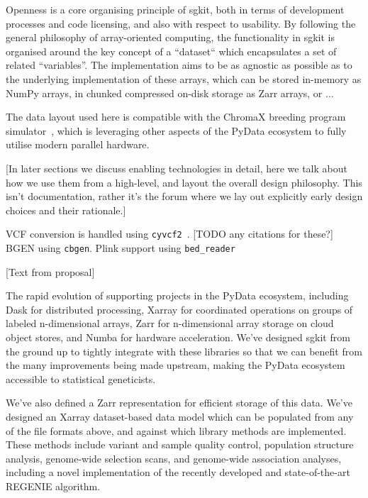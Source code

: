 \documentclass[a4paper,num-refs]{oup-contemporary}
\newcommand{\toolname}[1]{\texttt{#1}}
\begin{document}
Openness is a core organising principle of sgkit, both in terms of
development processes and code licensing, and also with respect
to usability. By following the general philosophy of array-oriented
computing, the functionality in sgkit is organised around the
key concept of a ``dataset`` which encapsulates a set of
related ``variables''. The implementation aims to be as agnostic
as possible as to the underlying implementation of these arrays,
which can be stored in-memory as NumPy arrays, in chunked
compressed on-disk storage as Zarr arrays, or ...

The data layout used here is compatible with the ChromaX
breeding program simulator~\citep{younis2023chromax}, which
is leveraging other aspects of the PyData ecosystem to
fully utilise modern parallel hardware.


[In later sections we discuss enabling technologies in detail,
here we talk about how we use them from a high-level, and layout
the overall design philosophy. This isn't documentation, rather
it's the forum where we lay out explicitly early design choices
and their rationale.]

VCF conversion is handled using
\toolname{cyvcf2}~\citep{pedersen2017cyvcf2}.
[TODO any citations for these?]
BGEN using \toolname{cbgen}.
Plink support using \toolname{bed\_reader}

[Text from proposal]

The rapid evolution of supporting projects in the PyData ecosystem, including Dask for
distributed processing, Xarray for coordinated operations on groups of labeled
n-dimensional arrays, Zarr for n-dimensional array storage on cloud object
stores, and Numba for hardware acceleration. We’ve designed sgkit from the
ground up to tightly integrate with these libraries so that we can benefit from
the many improvements being made upstream, making the PyData ecosystem
accessible to statistical geneticists.

We've also defined a Zarr representation for efficient storage of this data.
We’ve designed an Xarray dataset-based data model which can be populated from
any of the file formats above, and against which library methods are
implemented. These methods include variant and sample quality control,
population structure analysis, genome-wide selection scans, and genome-wide
association analyses, including a novel implementation of the recently
developed and state-of-the-art REGENIE algorithm.
\end{document}
